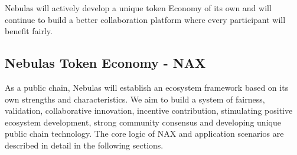 Nebulas will actively develop a unique token Economy of its own and will continue to build a better collaboration platform where every participant will benefit fairly.

\subsection{Nebulas Token Economy - NAX}
As a public chain, Nebulas will establish an ecosystem framework based on its own strengths and characteristics. We aim to build a system of fairness, validation, collaborative innovation, incentive contribution, stimulating positive ecosystem development, strong community consensus and developing unique public chain technology. The core logic of NAX and application scenarios are described in detail in the following sections.
